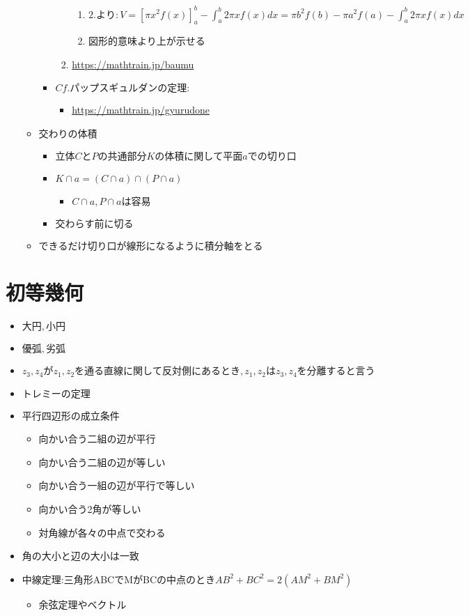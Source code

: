 \documentclass[dvipdfmx,uplatex]{jsarticle}
\begin{document}
\begin{itemize}
\begin{itemize}
\begin{itemize}
\begin{enumerate}
				\begin{enumerate}
					\item $ 2.より:V = [\pi x^2 f(x)]^b_a - \int^b_a 2 \pi xf(x)dx = \pi b^2 f(b) - \pi a^2 f(a) - \int^b_a 2 \pi xf(x)dx$
					\item 図形的意味より上が示せる
				\end{enumerate}
				\item \url{https://mathtrain.jp/baumu}
			\end{enumerate}
			\item $ Cf. パップスギュルダンの定理: $
			\begin{itemize}
				\item \url{https://mathtrain.jp/gyurudone}
			\end{itemize}
		\end{itemize}
		\item $ 交わりの体積$
		\begin{itemize}
			\item $ 立体CとPの共通部分Kの体積に関して平面aでの切り口$
			\item $ K \cap a = (C \cap a) \cap (P \cap a)$
			\begin{itemize}
				\item $ C \cap a, P \cap a は容易$
			\end{itemize}
			\item $ 交わらす前に切る$
		\end{itemize}
		\item $ できるだけ切り口が線形になるように積分軸をとる$
	\end{itemize}
\end{itemize}

\section{初等幾何}
\begin{itemize}
	\item $ 大円,小円$
	\item $ 優弧,劣弧$
	\item $ z_3,z_4がz_1,z_2を通る直線に関して反対側にあるとき,z_1,z_2はz_3,z_4を分離すると言う$
	\item $ トレミーの定理$
	\item 平行四辺形の成立条件
	\begin{itemize}
		\item 向かい合う二組の辺が平行
		\item 向かい合う二組の辺が等しい
		\item 向かい合う一組の辺が平行で等しい
		\item 向かい合う2角が等しい
		\item 対角線が各々の中点で交わる
	\end{itemize}
	\item 角の大小と辺の大小は一致
	\item 中線定理:三角形ABCでMがBCの中点のとき$AB^2+BC^2=2(AM^2+BM^2)$
	\begin{itemize}
		\item 余弦定理やベクトル
	\end{itemize}
\end{itemize}
\end{document}
